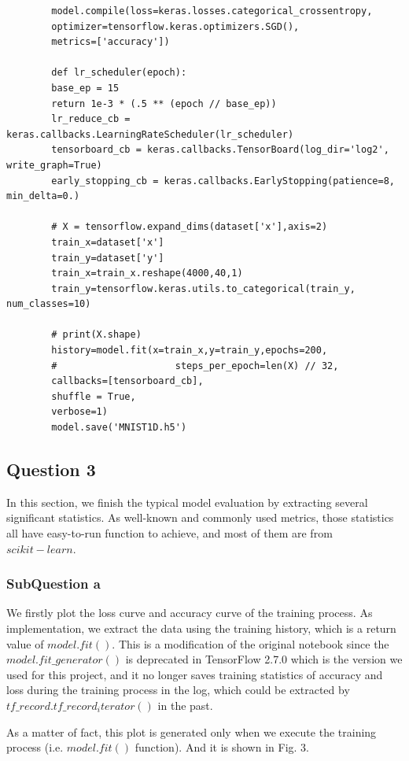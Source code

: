 \documentclass[conference]{IEEEtran}
\begin{document}
	\begin{lstlisting}
		model.compile(loss=keras.losses.categorical_crossentropy,
		optimizer=tensorflow.keras.optimizers.SGD(),
		metrics=['accuracy'])
		
		def lr_scheduler(epoch):
		base_ep = 15
		return 1e-3 * (.5 ** (epoch // base_ep))
		lr_reduce_cb = keras.callbacks.LearningRateScheduler(lr_scheduler)
		tensorboard_cb = keras.callbacks.TensorBoard(log_dir='log2', write_graph=True)
		early_stopping_cb = keras.callbacks.EarlyStopping(patience=8, min_delta=0.)
		
		# X = tensorflow.expand_dims(dataset['x'],axis=2)
		train_x=dataset['x']
		train_y=dataset['y']
		train_x=train_x.reshape(4000,40,1)
		train_y=tensorflow.keras.utils.to_categorical(train_y, num_classes=10)
		
		# print(X.shape)
		history=model.fit(x=train_x,y=train_y,epochs=200,
		#                     steps_per_epoch=len(X) // 32,
		callbacks=[tensorboard_cb],                  
		shuffle = True,
		verbose=1)
		model.save('MNIST1D.h5')
	\end{lstlisting}
	
	\subsection{Question 3}
	
	In this section, we finish the typical model evaluation by extracting several significant statistics. As well-known and commonly used metrics, those statistics all have easy-to-run function to achieve, and most of them are from $scikit-learn$.
	
	\subsubsection{SubQuestion a}
	
	We firstly plot the loss curve and accuracy curve of the training process. As implementation, we extract the data using the training history, which is a return value of $model.fit()$. This is a modification of the original notebook since the $model.fit\_generator()$ is deprecated in TensorFlow 2.7.0 which is the version we used for this project, and it no longer saves training statistics of accuracy and loss during the training process in the log, which could be extracted by $tf\_record.tf\_record_iterator()$ in the past.\par
	As a matter of fact, this plot is generated only when we execute the training process (i.e. $model.fit()$ function). And it is shown in Fig. 3.
	
\end{document}

